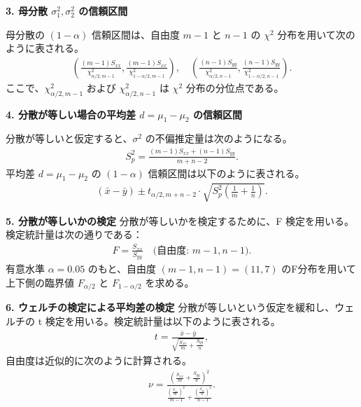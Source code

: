 \documentclass[10pt]{jsarticle}
\begin{document}
{\bf 3. 母分散 \(\sigma_1^2, \sigma_2^2\) の信頼区間}

母分散の \((1 - \alpha)\) 信頼区間は、自由度 \(m-1\) と \(n-1\) の \(\chi^2\) 分布を用いて次のように表される。
\begin{align*}
    \left( \frac{(m-1) S_{xx}}{\chi^2_{\alpha/2, m-1}}, \frac{(m-1) S_{xx}}{\chi^2_{1-\alpha/2, m-1}} \right), \quad
    \left( \frac{(n-1) S_{yy}}{\chi^2_{\alpha/2, n-1}}, \frac{(n-1) S_{yy}}{\chi^2_{1-\alpha/2, n-1}} \right).
\end{align*}
ここで、\(\chi^2_{\alpha/2, m-1}\) および \(\chi^2_{\alpha/2, n-1}\) は \(\chi^2\) 分布の分位点である。

{\bf 4. 分散が等しい場合の平均差 \(d = \mu_1 - \mu_2\) の信頼区間}

分散が等しいと仮定すると、\(\sigma^2\) の不偏推定量は次のようになる。
\begin{align*}
    S_p^2 = \frac{(m-1) S_{xx} + (n-1) S_{yy}}{m + n - 2}.
\end{align*}
平均差 \(d = \mu_1 - \mu_2\) の \((1 - \alpha)\) 信頼区間は以下のように表される。
\begin{align*}
    (\bar{x} - \bar{y}) \pm t_{\alpha/2, m+n-2} \cdot \sqrt{S_p^2 \left( \frac{1}{m} + \frac{1}{n} \right)}.
\end{align*}

{\bf 5. 分散が等しいかの検定}
分散が等しいかを検定するために、F 検定を用いる。検定統計量は次の通りである：
\begin{align*}
    F = \frac{S_{xx}}{S_{yy}} \quad \text{(自由度: \(m-1, n-1\))}.
\end{align*}
有意水準 
$\alpha=0.05$ のもと、自由度 
$(m−1,n−1)=(11,7)$ のF分布を用いて上下側の臨界値 
$F_{\alpha/2}$ と $F_{1−\alpha/2}$ を求める。

{\bf 6. ウェルチの検定による平均差の検定}
分散が等しいという仮定を緩和し、ウェルチの t 検定を用いる。検定統計量は以下のように表される。
\begin{align*}
    t = \frac{\bar{x} - \bar{y}}{\sqrt{\frac{S_{xx}}{m} + \frac{S_{yy}}{n}}},
\end{align*}
自由度は近似的に次のように計算される。
\begin{align*}
    \nu = \frac{\left( \frac{S_{xx}}{m} + \frac{S_{yy}}{n} \right)^2}{\frac{\left( \frac{S_{xx}}{m} \right)^2}{m-1} + \frac{\left( \frac{S_{yy}}{n} \right)^2}{n-1}}.
\end{align*}
\end{document}

